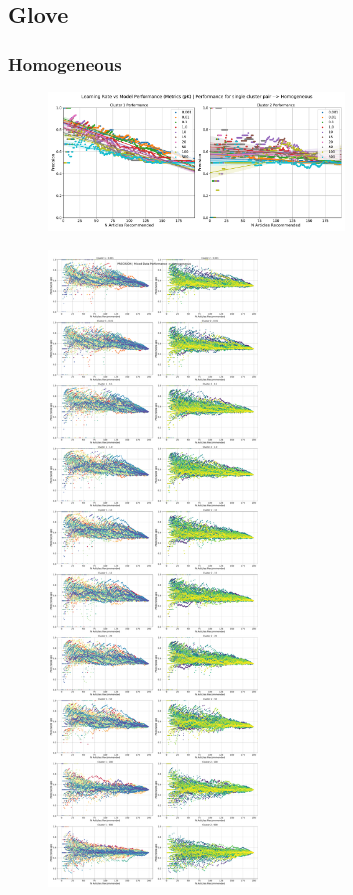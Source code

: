 \documentclass[a4paper,fontsize=8.0pt]{scrartcl}
\begin{document}
\subsection{Glove}
\subsubsection{Homogeneous}
\begin{figure}[H]
    \includegraphics[width=0.7\textwidth]{Graphs/GLOVE/lr_vs_model_performance_single_mixed_Homogeneous.pdf}
\end{figure}
\newpage
\begin{figure}[H]
    \includegraphics[width=0.5\textwidth]{Graphs/GLOVE/lr_vs_model_performance_precision_all_cps_mixed_data_sep_Homogeneous.pdf}
\end{figure}
\newpage
\end{document}
